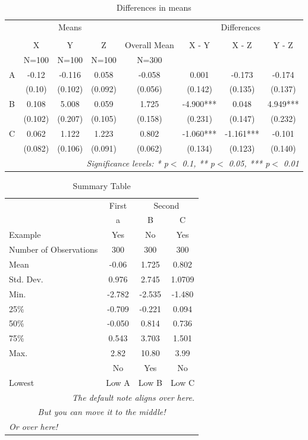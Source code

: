 \begin{table}[!htbp]
  \centering
  \caption{Differences in means}
  \label{table:differencesinmeans}
\begin{tabular}{lccccccc}
  \toprule
  \toprule
   & \multicolumn{3}{c}{Means} & \multicolumn{1}{c}{} & \multicolumn{3}{c}{Differences} \\
  \cline{2-4}\cline{6-8}\\

   & X & Y & Z & Overall Mean & X - Y & X - Z & Y - Z\\
   & N=100 & N=100 & N=100 & N=300 &  &  & \\
  \midrule
  A & -0.12 & -0.116 & 0.058 & -0.058 & 0.001 & -0.173 & -0.174 \\
   & (0.10) & (0.102) & (0.092) & (0.056) & (0.142) & (0.135) & (0.137) \\
  B & 0.108 & 5.008 & 0.059 & 1.725 & -4.900*** & 0.048 & 4.949*** \\
   & (0.102) & (0.207) & (0.105) & (0.158) & (0.231) & (0.147) & (0.232) \\
  C & 0.062 & 1.122 & 1.223 & 0.802 & -1.060*** & -1.161*** & -0.101 \\
   & (0.082) & (0.106) & (0.091) & (0.062) & (0.134) & (0.123) & (0.140) \\
  \bottomrule
  \multicolumn{8}{r}{{\small \textit{Significance levels: * p$<$ 0.1, ** p$<$ 0.05, *** p$<$ 0.01}}}\\
\end{tabular}
\end{table}
\begin{table}[!htbp]
  \centering
  \caption{Summary Table}
  \label{table:summarytable}
\begin{tabular}{lccc}
  \toprule
  \toprule
   & \multicolumn{1}{c}{First} & \multicolumn{2}{c}{Second} \\
   & a & B & C\\
  Example & Yes & No & Yes\\
  \midrule
  Number of Observations & 300 & 300 & 300 \\
  Mean & -0.06 & 1.725 & 0.802 \\
  Std. Dev. & 0.976 & 2.745 & 1.0709 \\
  Min. & -2.782 & -2.535 & -1.480 \\
  25\% & -0.709 & -0.221 & 0.094 \\
  50\% & -0.050 & 0.814 & 0.736 \\
  75\% & 0.543 & 3.703 & 1.501 \\
  Max. & 2.82 & 10.80 & 3.99 \\
   & No & Yes & No\\
  \bottomrule
  Lowest & Low A & Low B & Low C\\
  \bottomrule
  \multicolumn{4}{r}{{\small \textit{The default note aligns over here.}}}\\
  \multicolumn{4}{c}{{\small \textit{But you can move it to the middle!}}}\\
  \multicolumn{4}{l}{{\small \textit{Or over here!}}}\\
\end{tabular}
\end{table}

